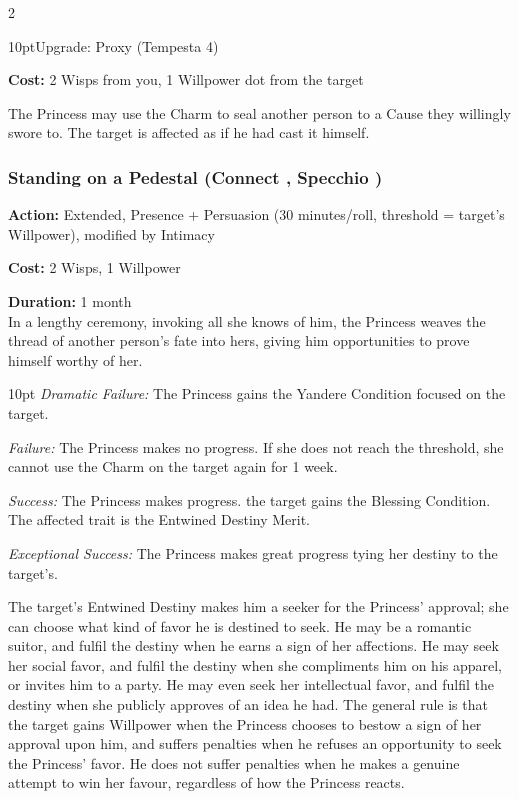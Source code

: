 \begin{multicols}{2}
\begin{myindentpar}{10pt}Upgrade: Proxy (Tempesta 4)

\noindent \textbf{Cost:} 2 Wisps from you, 1 Willpower dot from the target

The Princess may use the Charm to seal another person to a Cause they willingly swore to. The target is affected as if he had cast it himself.\end{myindentpar}

\subsubsection*{Standing on a Pedestal (Connect \textbullet\textbullet\textbullet\textbullet, Specchio \textbullet\textbullet\textbullet)}

\noindent \textbf{Action:} Extended, Presence + Persuasion (30 minutes/roll, threshold = target's Willpower), modified by Intimacy

\noindent \textbf{Cost:} 2 Wisps, 1 Willpower

\noindent \textbf{Duration:} 1 month \\

\noindent In a lengthy ceremony, invoking all she knows of him, the Princess weaves the thread of another person's fate into hers, giving him opportunities to prove himself worthy of her.

\begin{myindentpar}{10pt}        \emph{Dramatic Failure:} The Princess gains the Yandere Condition focused on the target.

        \emph{Failure:} The Princess makes no progress. If she does not reach the threshold, she cannot use the Charm on the target again for 1 week.

        \emph{Success:} The Princess makes progress. the target gains the Blessing Condition. The affected trait is the Entwined Destiny Merit.

        \emph{Exceptional Success:} The Princess makes great progress tying her destiny to the target's.\end{myindentpar}

The target's Entwined Destiny makes him a seeker for the Princess' approval; she can choose what kind of favor he is destined to seek. He may be a romantic suitor, and fulfil the destiny when he earns a sign of her affections. He may seek her social favor, and fulfil the destiny when she compliments him on his apparel, or invites him to a party. He may even seek her intellectual favor, and fulfil the destiny when she publicly approves of an idea he had. The general rule is that the target gains Willpower when the Princess chooses to bestow a sign of her approval upon him, and suffers penalties when he refuses an opportunity to seek the Princess' favor. He does not suffer penalties when he makes a genuine attempt to win her favour, regardless of how the Princess reacts.


\end{multicols}
